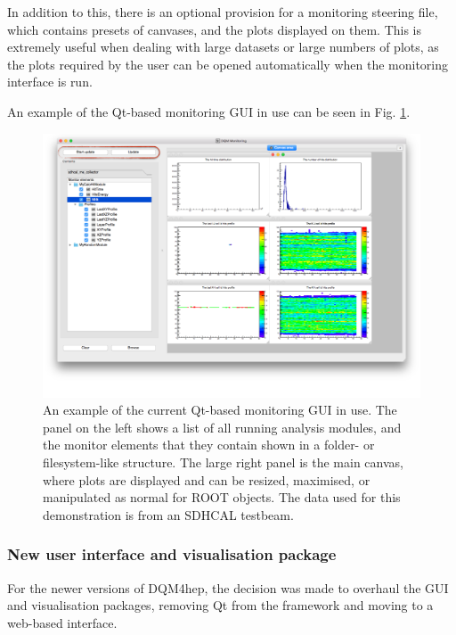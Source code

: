 In addition to this, there is an optional provision for a monitoring steering file, which contains presets of canvases, and the plots displayed on them. This is extremely useful when dealing with large datasets or large numbers of plots, as the plots required by the user can be opened automatically when the monitoring interface is run.

An example of the Qt-based monitoring \acrshort{GUI} in use can be seen in Fig. \ref{figure:daq/dqm4hep/old-gui}. 

\begin{figure}[h]
	\centering
	\includegraphics[width=1.0\textwidth]{../Pictures/DQM4hepMonitoringGui.png}
	\caption{An example of the current Qt-based monitoring \acrshort{GUI} in use. The panel on the left shows a list of all running analysis modules, and the monitor elements that they contain shown in a folder- or filesystem-like structure. The large right panel is the main canvas, where plots are displayed and can be resized, maximised, or manipulated as normal for ROOT objects. The data used for this demonstration is from an \acrshort{SDHCAL} testbeam.}
	\label{figure:daq/dqm4hep/old-gui}
\end{figure}

\subsubsection{New user interface and visualisation package}
For the newer versions of \acrshort{DQM4hep}, the decision was made to overhaul the \acrshort{GUI} and visualisation packages, removing Qt from the framework and moving to a web-based interface.

